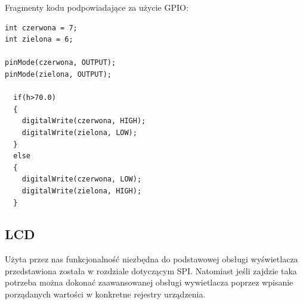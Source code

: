 \documentclass{classrep}
\begin{document}
Fragmenty kodu podpowiadające za użycie GPIO:
\begin{lstlisting}
int czerwona = 7;
int zielona = 6;

pinMode(czerwona, OUTPUT);
pinMode(zielona, OUTPUT);

  if(h>70.0)
  {
    digitalWrite(czerwona, HIGH);
    digitalWrite(zielona, LOW);
  }
  else
  {
    digitalWrite(czerwona, LOW);
    digitalWrite(zielona, HIGH);
  }
\end{lstlisting}

\subsection {LCD}
Użyta przez nas funkcjonalność niezbędna do podstawowej obsługi wyświetlacza przedstawiona została w rozdziale dotyczącym SPI. Natomiast jeśli zajdzie taka potrzeba można dokonać zaawansowanej obsługi wywietlacza poprzez wpisanie porządanych wartości w konkretne rejestry urządzenia. \\
\end{document}

